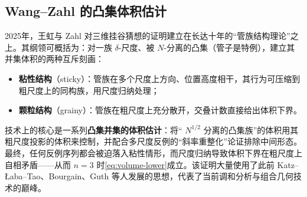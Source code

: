 \subsection{Wang--Zahl 的凸集体积估计}

2025年，王虹与 Zahl 对三维挂谷猜想的证明\cite{wangzahl2025}建立在长达十年的“管族结构理论”之上。其纲领可概括为：对一族 $\delta$-尺度、被 $N$-分离的凸集（管子是特例），建立其并集体积的两种互斥刻画：

\begin{itemize}
    \item \textbf{粘性结构}（sticky）：管族在多个尺度上方向、位置高度相干，其行为可压缩到粗尺度上的同构族，用尺度归纳处理；
    \item \textbf{颗粒结构}（grainy）：管族在粗尺度上充分散开，交叠计数直接给出体积下界。
\end{itemize}

技术上的核心是一系列\textbf{凸集并集的体积估计}：将“ $N^{1/2}$ 分离的凸集族”的体积用其粗尺度投影的体积来控制，并配合多尺度反例的“斜率重整化”论证排除中间形态。最终，任何反例序列都会被迫落入粘性情形，而尺度归纳导致体积下界在粗尺度上自相矛盾——从而 $n = 3$ 时\cref{eq:volume-lower}成立。该证明大量使用了此前 Katz--\L aba--Tao、Bourgain、Guth 等人发展的思想，代表了当前调和分析与组合几何技术的巅峰。
